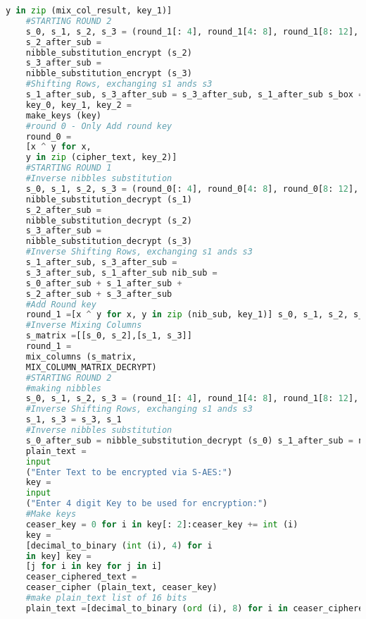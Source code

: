 \documentclass{article}
\begin{document}
\begin{lstlisting}[language=python, caption={Input Code}]
	y in zip (mix_col_result, key_1)]
	#STARTING ROUND 2
	s_0, s_1, s_2, s_3 = (round_1[: 4], round_1[4: 8], round_1[8: 12], round_1[12:])s_0_after_sub = nibble_substitution_encrypt (s_0) s_1_after_sub = nibble_substitution_encrypt (s_1)
	s_2_after_sub =
	nibble_substitution_encrypt (s_2)
	s_3_after_sub =
	nibble_substitution_encrypt (s_3)
	#Shifting Rows, exchanging s1 ands s3
	s_1_after_sub, s_3_after_sub = s_3_after_sub, s_1_after_sub s_box = s_0_after_sub + s_1_after_sub + s_2_after_sub + s_3_after_sub round_2 =[x ^ y for x, y in zip (s_box, key_2)] return round_2 def decrypt_SAES_cipher (cipher_text, key):
	key_0, key_1, key_2 =
	make_keys (key)
	#round 0 - Only Add round key
	round_0 =
	[x ^ y for x,
	y in zip (cipher_text, key_2)]
	#STARTING ROUND 1
	#Inverse nibbles substitution
	s_0, s_1, s_2, s_3 = (round_0[: 4], round_0[4: 8], round_0[8: 12], round_0[12:])s_0_after_sub = nibble_substitution_decrypt (s_0) s_1_after_sub =
	nibble_substitution_decrypt (s_1)
	s_2_after_sub =
	nibble_substitution_decrypt (s_2)
	s_3_after_sub =
	nibble_substitution_decrypt (s_3)
	#Inverse Shifting Rows, exchanging s1 ands s3
	s_1_after_sub, s_3_after_sub =
	s_3_after_sub, s_1_after_sub nib_sub =
	s_0_after_sub + s_1_after_sub +
	s_2_after_sub + s_3_after_sub
	#Add Round key
	round_1 =[x ^ y for x, y in zip (nib_sub, key_1)] s_0, s_1, s_2, s_3 = (round_1[: 4], round_1[4: 8], round_1[8: 12], round_1[12:])
	#Inverse Mixing Columns
	s_matrix =[[s_0, s_2],[s_1, s_3]]
	round_1 =
	mix_columns (s_matrix,
	MIX_COLUMN_MATRIX_DECRYPT)
	#STARTING ROUND 2
	#making nibbles
	s_0, s_1, s_2, s_3 = (round_1[: 4], round_1[4: 8], round_1[8: 12], round_1[12:])
	#Inverse Shifting Rows, exchanging s1 ands s3
	s_1, s_3 = s_3, s_1
	#Inverse nibbles substitution
	s_0_after_sub = nibble_substitution_decrypt (s_0) s_1_after_sub = nibble_substitution_decrypt (s_1) s_2_after_sub = nibble_substitution_decrypt (s_2) s_3_after_sub = nibble_substitution_decrypt (s_3) s_box = s_0_after_sub + s_1_after_sub + s_2_after_sub + s_3_after_subround_2 =[x ^ y for x, y in zip (s_box, key_0)] return round_2 def main ():
	plain_text =
	input
	("Enter Text to be encrypted via S-AES:")
	key =
	input
	("Enter 4 digit Key to be used for encryption:")
	#Make keys
	ceaser_key = 0 for i in key[: 2]:ceaser_key += int (i)
	key =
	[decimal_to_binary (int (i), 4) for i
	in key] key =
	[j for i in key for j in i]
	ceaser_ciphered_text =
	ceaser_cipher (plain_text, ceaser_key)
	#make plain_text list of 16 bits
	plain_text =[decimal_to_binary (ord (i), 8) for i in ceaser_ciphered_text] plain_text =[j for i in plain_text for j in i] plain_texts =[plain_text[i: i + 16] for i in range (0, len (plain_text), 16)] for i in plain_texts:

\end{lstlisting}
\end{document}
